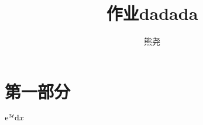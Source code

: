 \documentclass{cart}
\title{作业dadada}
\author{熊尧\quad 41710015}
\begin{document}
    \maketitle
    \section{第一部分}
    $\mathrm e^{3t}\mathrm d x$
\end{document}
